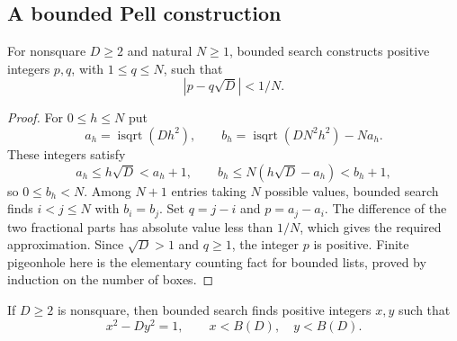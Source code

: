 \subsection{A bounded Pell construction}

\begin{lemma}
\label{lem:stormer-dirichlet}
For nonsquare $D\ge2$ and natural $N\ge1$, bounded search constructs positive
integers $p,q$, with $1\le q\le N$, such that
\[
                 |p-q\sqrt D|<1/N.
\]
\end{lemma}

\begin{proof}
For $0\le h\le N$ put
\[
 a_h=\operatorname{isqrt}(Dh^2),\qquad
 b_h=\operatorname{isqrt}(DN^2h^2)-Na_h.
\]
These integers satisfy
\[
 a_h\le h\sqrt D<a_h+1,
 \qquad
 b_h\le N(h\sqrt D-a_h)<b_h+1,
\]
so $0\le b_h<N$.  Among $N+1$ entries taking $N$ possible values, bounded
search finds $i<j\le N$ with $b_i=b_j$.  Set $q=j-i$ and $p=a_j-a_i$.
The difference of the two fractional parts has absolute value less than $1/N$,
which gives the required approximation.  Since $\sqrt D>1$ and $q\ge1$, the
integer $p$ is positive.  Finite pigeonhole here is the elementary counting fact
for bounded lists, proved by induction on the number of boxes.
\end{proof}

\begin{lemma}
\label{lem:stormer-pell-bound}
If $D\ge2$ is nonsquare, then bounded search finds positive integers $x,y$ such
that
\[
 x^2-Dy^2=1,
 \qquad x<B(D),\quad y<B(D).
\]
\end{lemma}

